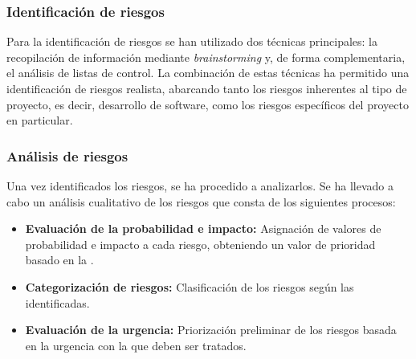 \subsubsection*{Identificación de riesgos}
Para la identificación de riesgos se han utilizado dos técnicas principales: la recopilación de información mediante \textit{brainstorming} y, de forma complementaria, el análisis de listas de control. La combinación de estas técnicas ha permitido una identificación de riesgos realista, abarcando tanto los riesgos inherentes al tipo de proyecto, es decir, desarrollo de software, como los riesgos específicos del proyecto en particular.

\subsubsection*{Análisis de riesgos}
Una vez identificados los riesgos, se ha procedido a analizarlos. Se ha llevado a cabo un análisis cualitativo de los riesgos que consta de los siguientes procesos:
\begin{itemize}
    \item \textbf{Evaluación de la probabilidad e impacto:} Asignación de valores de probabilidad e impacto a cada riesgo, obteniendo un valor de prioridad basado en la .
    \item \textbf{Categorización de riesgos:} Clasificación de los riesgos según las  identificadas.
    \item \textbf{Evaluación de la urgencia:} Priorización preliminar de los riesgos basada en la urgencia con la que deben ser tratados.
\end{itemize}
